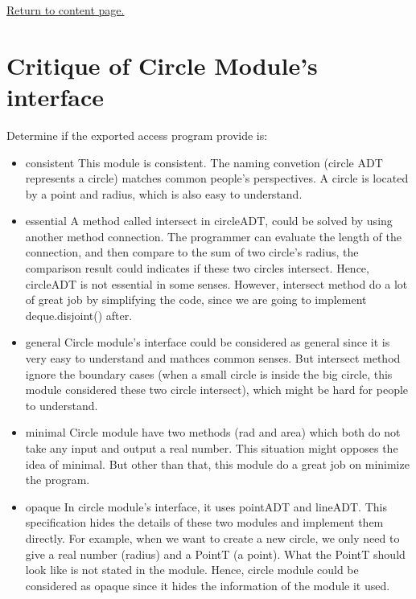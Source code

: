 \documentclass[12pt]{article}
\begin{document}
\vskip 5cm
\hyperlink{toc}{Return to content page.}

\section{Critique of Circle Module's interface}

  Determine if the exported access program provide is:
  \begin{itemize}
    \item consistent
    \newline This module is consistent. The naming convetion
    (circle ADT represents a circle) matches common people's
    perspectives. A circle is located by a point and radius,
    which is also easy to understand.
    \item essential
    \newline A method called intersect in circleADT, could be
    solved by using another method connection. The programmer
    can evaluate the length of the connection, and then compare
    to the sum of two circle's radius, the comparison result
    could indicates if these two circles intersect. Hence, 
    circleADT is not essential in some senses. However, intersect
    method do a lot of great job by simplifying the code, since
    we are going to implement deque.disjoint() after. 
    \item general
    \newline Circle module's interface could be considered as
    general since it is very easy to understand and mathces
    common senses. But intersect method ignore the boundary cases
    (when a small circle is inside the big circle, this module
    considered these two circle intersect), which might be hard
    for people to understand.
    \item minimal
    \newline Circle module have two methods (rad and area) which
    both do not take any input and output a real number. This 
    situation might opposes the idea of minimal. But other than
    that, this module do a great job on minimize the program.
    \item opaque
    \newline In circle module's interface, it uses pointADT and
    lineADT. This specification hides the details of these two
    modules and implement them directly. For example, when we 
    want to create a new circle, we only need to give a real
    number (radius) and a PointT (a point). What the PointT should
    look like is not stated in the module. Hence, circle module 
    could be considered as opaque since it hides the information
    of the module it used.
  \end{itemize}
\end{document}
